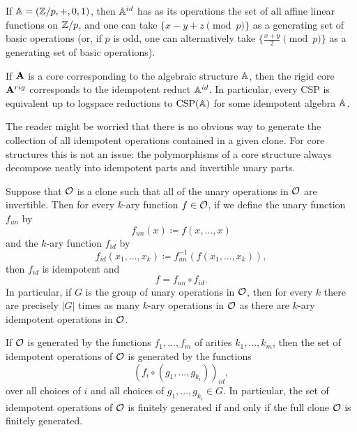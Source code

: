 \documentclass[letterpaper,11pt]{article}
\DeclareMathOperator{\CSP}{CSP}
\begin{document}
\begin{ex} If $\mathbb{A} = (\mathbb{Z}/p, +, 0, 1)$, then $\mathbb{A}^{id}$ has as its operations the set of all affine linear functions on $\mathbb{Z}/p$, and one can take $\{x-y+z \pmod{p}\}$ as a generating set of basic operations (or, if $p$ is odd, one can alternatively take $\{\frac{x+y}{2} \pmod{p}\}$ as a generating set of basic operations).
\end{ex}

\begin{prop} If $\mathbf{A}$ is a core corresponding to the algebraic structure $\mathbb{A}$, then the rigid core $\mathbf{A}^{rig}$ corresponds to the idempotent reduct $\mathbb{A}^{id}$. In particular, every CSP is equivalent up to logspace reductions to $\CSP(\bA)$ for some idempotent algebra $\mathbb{A}$.
\end{prop}

The reader might be worried that there is no obvious way to generate the collection of all idempotent operations contained in a given clone. For core structures this is not an issue: the polymorphisms of a core structure always decompose neatly into idempotent parts and invertible unary parts.

\begin{prop} Suppose that $\mathcal{O}$ is a clone such that all of the unary operations in $\mathcal{O}$ are invertible. Then for every $k$-ary function $f \in \mathcal{O}$, if we define the unary function $f_{un}$ by
\[
f_{un}(x) \coloneqq f(x,...,x)
\]
and the $k$-ary function $f_{id}$ by
\[
f_{id}(x_1,...,x_k) \coloneqq f_{un}^{-1}(f(x_1, ..., x_k)),
\]
then $f_{id}$ is idempotent and
\[
f = f_{un} \circ f_{id}.
\]
In particular, if $G$ is the group of unary operations in $\mathcal{O}$, then for every $k$ there are precisely $|G|$ times as many $k$-ary operations in $\mathcal{O}$ as there are $k$-ary idempotent operations in $\mathcal{O}$.

If $\mathcal{O}$ is generated by the functions $f_1, ..., f_m$ of arities $k_1, ..., k_m$, then the set of idempotent operations of $\mathcal{O}$ is generated by the functions
\[
(f_i \circ (g_{1}, ..., g_{k_i}))_{id},
\]
over all choices of $i$ and all choices of $g_1, ..., g_{k_i} \in G$. In particular, the set of idempotent operations of $\mathcal{O}$ is finitely generated if and only if the full clone $\mathcal{O}$ is finitely generated.
\end{prop}
\end{document}
